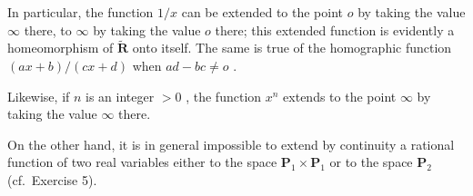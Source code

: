 In particular, the function \(1 / x\) can be extended to the point \(o\) by taking the value \(\infty\) there, to \(\infty\) by taking the value \(o\) there; this extended function is evidently a homeomorphism of \(\tilde{\mathbf{R}}\) onto itself. The same is true of the homographic function \((ax + b) / (cx + d)\) when \(ad - bc \neq o\) .

Likewise, if \(n\) is an integer \(> 0\) , the function \(x^n\) extends to the point \(\infty\) by taking the value \(\infty\) there.

On the other hand, it is in general impossible to extend by continuity a rational function of two real variables either to the space \(\mathbf{P}_1 \times \mathbf{P}_1\) or to the space \(\mathbf{P}_2\) (cf.~Exercise 5).

